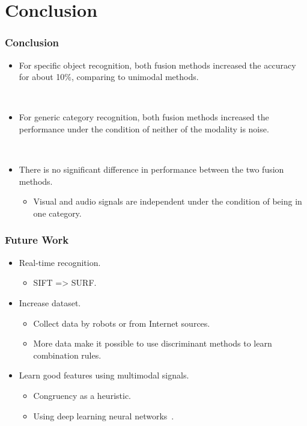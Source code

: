 \documentclass{beamer}
\begin{document}
  \section{Conclusion}
  \begin{frame}
    \frametitle{Conclusion}

    \begin{itemize}
      \item For specific object recognition, both fusion methods increased the accuracy for about 10\%, comparing to unimodal methods.

        ~
      \item For generic category recognition, both fusion methods increased the performance under the condition of neither of the modality is noise.

        ~
      \item There is no significant difference in performance between the two fusion methods.
        \begin{itemize}
          \item Visual and audio signals are independent under the condition of being in one category.
        \end{itemize}
    \end{itemize}
  \end{frame}

  \begin{frame}
    \frametitle{Future Work}

    \begin{itemize}
      \item Real-time recognition.
        \begin{itemize}
          \item SIFT => SURF.
        \end{itemize}

      \item Increase dataset.
        \begin{itemize}
          \item Collect data by robots or from Internet sources.
          \item More data make it possible to use discriminant methods to learn combination rules.
        \end{itemize}

      \item Learn good features using multimodal signals.
        \begin{itemize}
          \item Congruency as a heuristic.
          \item Using deep learning neural networks~\cite{ngiam_multimodal_2011}.
        \end{itemize}
    \end{itemize}
  \end{frame}
\end{document}
